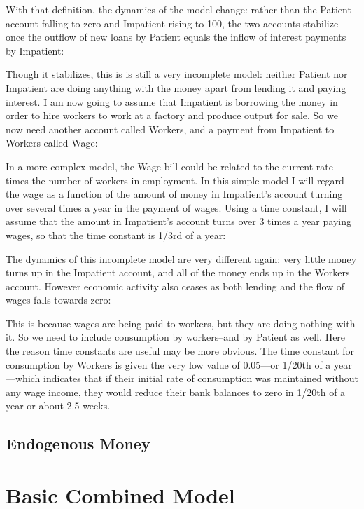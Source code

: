 

With that definition, the dynamics of the model change: rather than
the Patient account falling to zero and Impatient rising to 100, the
two accounts stabilize once the outflow of new loans by Patient equals
the inflow of interest payments by Impatient:



Though it stabilizes, this is is still a very incomplete model:
neither Patient nor Impatient are doing anything with the money apart
from lending it and paying interest. I am now going to assume that
Impatient is borrowing the money in order to hire workers to work at a
factory and produce output for sale. So we now need another account
called Workers, and a payment from Impatient to Workers called Wage:




In a more complex model, the Wage bill could be related to the current
rate times the number of workers in employment. In this simple model I
will regard the wage as a function of the amount of money in
Impatient's account turning over several times a year in the payment
of wages. Using a time constant, I will assume that the amount in
Impatient's account turns over 3 times a year paying wages, so that
the time constant is 1/3rd of a year:



The dynamics of this incomplete model are very different again: very
little money turns up in the Impatient account, and all of the money
ends up in the Workers account. However economic activity also ceases
as both lending and the flow of wages falls towards zero:



This is because wages are being paid to workers, but they are doing
nothing with it. So we need to include consumption by workers--and by
Patient as well. Here the reason time constants are useful may be more
obvious. The time constant for consumption by Workers is given the
very low value of 0.05---or 1/20th of a year---which indicates that if
their initial rate of consumption was maintained without any wage
income, they would reduce their bank balances to zero in 1/20th of a
year or about 2.5 weeks.

\subsection{Endogenous Money}\label{tut:money}

\section{Basic Combined Model}


